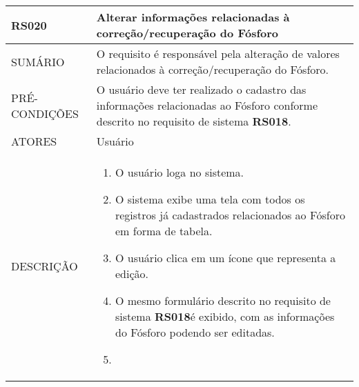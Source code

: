 \begin{longtable}[c]{@{}|p{4cm}|p{9cm}|@{}}
\hline
\begin{minipage}[t]{0.47\columnwidth}
\textbf{RS020}
\end{minipage} & \begin{minipage}[t]{0.47\columnwidth}
Alterar informações relacionadas à correção/recuperação do
Fósforo
\end{minipage}
\\\hline
\begin{minipage}[t]{0.47\columnwidth}
SUMÁRIO
\end{minipage} & \begin{minipage}[t]{0.47\columnwidth}
O requisito é responsável pela alteração de valores relacionados à
correção/recuperação do Fósforo.
\end{minipage}
\\\hline
\begin{minipage}[t]{0.47\columnwidth}
PRÉ-CONDIÇÕES
\end{minipage} & \begin{minipage}[t]{0.47\columnwidth}
O usuário deve ter realizado o cadastro das informações relacionadas ao
Fósforo conforme descrito no requisito de sistema \textbf{RS018}.
\end{minipage}
\\\hline
\begin{minipage}[t]{0.47\columnwidth}
ATORES
\end{minipage} & \begin{minipage}[t]{0.47\columnwidth}
Usuário
\end{minipage}
\\\hline
\begin{minipage}[t]{0.47\columnwidth}
DESCRIÇÃO
\end{minipage} & \begin{minipage}[t]{0.47\columnwidth}
\begin{enumerate}
\def\labelenumi{\arabic{enumi}.}
\itemsep1pt\parskip0pt\parsep0pt
\item
  O usuário loga no sistema.
\item
  O sistema exibe uma tela com todos os registros já cadastrados
  relacionados ao Fósforo em forma de tabela.
\item
  O usuário clica em um ícone que representa a edição.
\item
  O mesmo formulário descrito no requisito de sistema \textbf{RS018}é exibido,
  com as informações do Fósforo podendo ser editadas.
\item

\end{enumerate}
\end{minipage}
\end{longtable}

